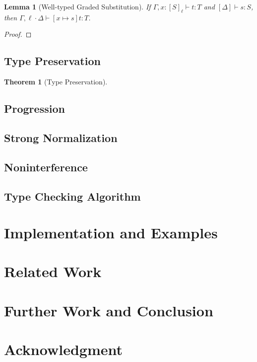 \documentclass[conference]{IEEEtran}
\newtheorem{theorem}{Theorem}
\newtheorem{lemma}{Lemma}
\begin{document}
\begin{lemma}[Well-typed Graded Substitution] 
	If $\Gamma,x:[S]_\ell\vdash t:T$ and $[\Delta]\vdash s:S$, then $\Gamma,\ell\cdot\Delta\vdash [x\mapsto s]t:T$.
\end{lemma}

\begin{proof}
	
\end{proof}

\subsection{Type Preservation}
\begin{theorem}[Type Preservation]
	
\end{theorem}

\subsection{Progression}

\subsection{Strong Normalization}

\subsection{Noninterference}

\subsection{Type Checking Algorithm}

\section{Implementation and Examples}

\section{Related Work}

\section{Further Work and Conclusion}

\section*{Acknowledgment}
\end{document}
